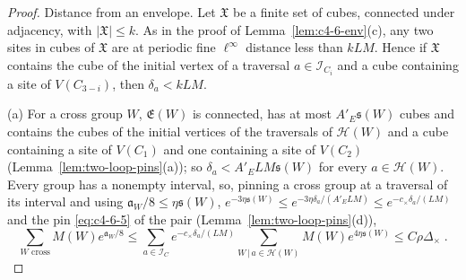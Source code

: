 \begin{proof}
Distance from an envelope. Let $\mathfrak X$ be a finite set of cubes, connected under adjacency, with $|\mathfrak X|\leq k$. As in the proof of Lemma~\ref{lem:c4-6-env}(c), any two sites in cubes of $\mathfrak X$ are at periodic fine $\ell^\infty$ distance less than $kLM$. Hence if $\mathfrak X$ contains the cube of the initial vertex of a traversal $a\in\mathcal I_{C_i}$ and a cube containing a site of $V(C_{3-i})$, then $\delta_a<kLM$.

(a) For a cross group $W$, $\mathfrak E(W)$ is connected, has at most $A'_E\mathfrak s(W)$ cubes and contains the cubes of the initial vertices of the traversals of $\mathcal H(W)$ and a cube containing a site of $V(C_1)$ and one containing a site of $V(C_2)$ (Lemma~\ref{lem:two-loop-pins}(a)); so $\delta_a<A'_ELM\mathfrak s(W)$ for every $a\in\mathcal H(W)$. Every group has a nonempty interval, so, pinning a cross group at a traversal of its interval and using $\mathfrak a_W/8\leq\eta\mathfrak s(W)$, $e^{-3\eta\mathfrak s(W)}\leq e^{-3\eta\delta_a/(A'_ELM)}\leq e^{-c_\times\delta_a/(LM)}$ and the pin \eqref{eq:c4-6-5} of the pair (Lemma~\ref{lem:two-loop-pins}(d)),
\[
    \sum_{W\text{ cross}}M(W)e^{\mathfrak a_W/8}\leq\sum_{a\in\mathcal I_C}e^{-c_\times\delta_a/(LM)}\sum_{W\,|\,a\in\mathcal H(W)}M(W)e^{4\eta\mathfrak s(W)}\leq C\rho\Delta_\times\;.
\]


\end{proof}
